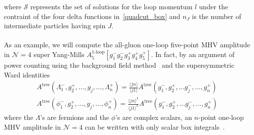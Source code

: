 where $\mathcal{S}$ represents the set of solutions for the loop momentum $l$ under the contraint of the four delta functions in~\cref{quadcut_box} and $n_J$ is the number of intermediate particles having spin $J$.
\\\\
As an example, we will compute the all-gluon one-loop five-point MHV amplitude in $\mathcal{N} = 4$ super Yang-Mills $A_5^{\textrm{1-loop}}[g_1^- g_2^- g_3^+ g_4^+ g_5^+]$. 
In fact, by an argument of power counting using the background field method~\cite{Gates:1983nr} and the supersymmetric Ward identities\begin{equation}\label{super_wi}
\begin{split}
A^{\mathrm{tree}}(\Lambda_1^-, g_2^+, \ldots, g_j, \ldots, \Lambda_n^+)
= \frac{\langle jn \rangle}{\langle j 1 \rangle}
A^{\mathrm{tree}}(g_1^-, g_2^+, \ldots g_j^-, \ldots , g_n^+)
\\
A^{\mathrm{tree}}(\phi_1^-, g_2^+, \ldots, g_j, \ldots, \phi_n^+)
= \frac{\langle jn \rangle^2}{\langle j 1 \rangle^2}
A^{\mathrm{tree}}(g_1^-, g_2^+, \ldots g_j^-, \ldots , g_n^+)
\end{split}
\end{equation}
where the $\Lambda$'s are fermions and the $\phi$'s are complex scalars,
an $n$-point one-loop MHV amplitude in $\mathcal{\mathcal{N}} = 4$ can be written with only scalar box integrals~\cite{Bern:1994zx}.